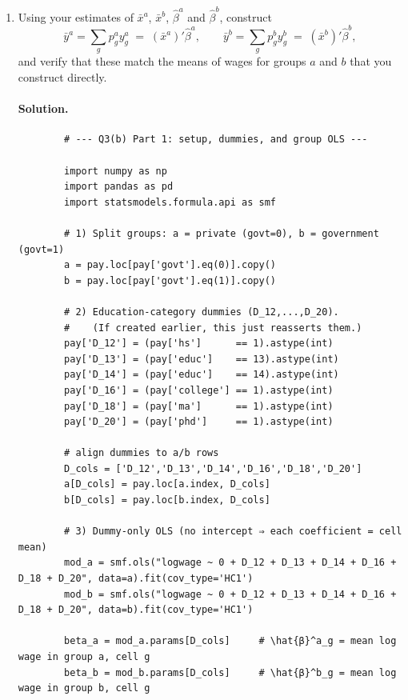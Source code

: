 \documentclass[12pt]{article}
\numberwithin{equation}{section}
\newcommand{\solution}{\paragraph{Solution.}}
\begin{document}
\begin{enumerate}[leftmargin=2em]
\begin{enumerate}[label=(\alph*),leftmargin=1.6em]
    \item Using your estimates of $\bar{x}^a$, $\bar{x}^b$, $\hat{\beta}^a$ and $\hat{\beta}^b$, construct
    \[
      \bar{y}^a = \sum_g p_g^a y_g^a \;=\; (\bar{x}^a)'\hat{\beta}^a,
      \qquad
      \bar{y}^b = \sum_g p_g^b y_g^b \;=\; (\bar{x}^b)'\hat{\beta}^b,
    \]
    and verify that these match the means of wages for groups $a$ and $b$ that you construct directly.

    \solution
        \begin{listing}[H]
        \begin{verbatim}
        # --- Q3(b) Part 1: setup, dummies, and group OLS ---
        
        import numpy as np
        import pandas as pd
        import statsmodels.formula.api as smf
        
        # 1) Split groups: a = private (govt=0), b = government (govt=1)
        a = pay.loc[pay['govt'].eq(0)].copy()
        b = pay.loc[pay['govt'].eq(1)].copy()
        
        # 2) Education-category dummies (D_12,...,D_20).
        #    (If created earlier, this just reasserts them.)
        pay['D_12'] = (pay['hs']      == 1).astype(int)
        pay['D_13'] = (pay['educ']    == 13).astype(int)
        pay['D_14'] = (pay['educ']    == 14).astype(int)
        pay['D_16'] = (pay['college'] == 1).astype(int)
        pay['D_18'] = (pay['ma']      == 1).astype(int)
        pay['D_20'] = (pay['phd']     == 1).astype(int)
        
        # align dummies to a/b rows
        D_cols = ['D_12','D_13','D_14','D_16','D_18','D_20']
        a[D_cols] = pay.loc[a.index, D_cols]
        b[D_cols] = pay.loc[b.index, D_cols]
        
        # 3) Dummy-only OLS (no intercept ⇒ each coefficient = cell mean)
        mod_a = smf.ols("logwage ~ 0 + D_12 + D_13 + D_14 + D_16 + D_18 + D_20", data=a).fit(cov_type='HC1')
        mod_b = smf.ols("logwage ~ 0 + D_12 + D_13 + D_14 + D_16 + D_18 + D_20", data=b).fit(cov_type='HC1')
        
        beta_a = mod_a.params[D_cols]     # \hat{β}^a_g = mean log wage in group a, cell g
        beta_b = mod_b.params[D_cols]     # \hat{β}^b_g = mean log wage in group b, cell g
        \end{verbatim}
        \caption{Code (Part 1): Setup, dummies, and group-specific OLS (cell means).}
        \end{listing}
        

\end{enumerate}
\end{enumerate}
\end{document}
